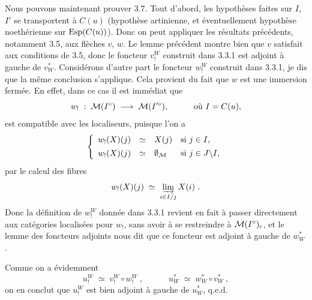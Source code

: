 Nous pouvons maintenant prouver 3.7. Tout d'abord, les hypothèses faites sur $I$, $I'$ se transportent à $C(u)$ (hypothèse artinienne, et éventuellement hypothèse noethérienne sur $\operatorname{Esp}(C(u))$). Donc
on peut appliquer les résultats précédents, notamment 3.5, aux flèches $v$, $w$. Le lemme précédent montre bien que $v$ satisfait aux conditions de 3.5, donc le foncteur $v_!^W$ construit dans 3.3.1 est adjoint à gauche de $v_W^*$. Considérons d'autre part le foncteur $w_!^W$ construit dans 3.3.1, je dis que la même conclusion s'applique. Cela provient du fait que $w$ est une immersion fermée. En effet, dans ce cas il est immédiat que
\[
w_! \;:\; \M(I^\circ) \;\longrightarrow\; \M(I'^\circ), \qquad\quad \text{où } I = C(u), %
\]
est compatible avec les localiseurs, puisque l'on a
\[
\left\{
\begin{array}{lcll}
w_!(X)(j) & \simeq & X(j) & \text{si } j\in I,\\[1ex]
w_!(X)(j) & \simeq & \emptyset_{\mathcal{M}} & \text{si } j\in J\backslash I,
\end{array}
\right.
\]
par le calcul des fibres
\[
w_!(X)(j) \;\simeq\; \varinjlim_{i\in I/j} X(i)\ .
\]
Donc la définition de $w_!^W$ donnée dans 3.3.1 revient en fait à passer directement aux catégories localisées pour $w_!$, sans avoir à se restreindre à $\mathcal{M}(I^\circ)_{\mathrm{c}}$, et le lemme des foncteurs adjoints nous dit que
ce foncteur est adjoint à gauche de $w_W^*$.

Comme on a évidemment
\[
u_!^W \;\simeq\; v_!^W\circ w_!^W\ , \qquad\quad u_W^* \;\simeq\; w_W^*\circ v_W^*\ ,
\]
on en conclut que $u_!^W$ est bien adjoint à gauche de $u_W^*$, q.e.d.

